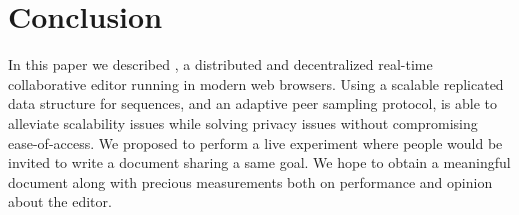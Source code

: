 
\section{Conclusion}
\label{sec:conclusion}

In this paper we described \CRATE, a distributed and decentralized real-time
collaborative editor running in modern web browsers. Using a scalable replicated
data structure for sequences, and an adaptive peer sampling protocol, \CRATE is
able to alleviate scalability issues while solving privacy issues without
compromising ease-of-access. We proposed to perform a live experiment where
people would be invited to write a document sharing a same goal. We hope to
obtain a meaningful document along with precious measurements both on
performance and opinion about the editor.

